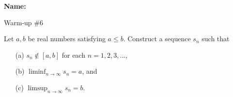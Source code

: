 \documentclass[12pt]{article}
\begin{document}
\noindent \textbf{Name:} 

\begin{center}
Warm-up \#6
\end{center}

\noindent Let $a,b$ be real numbers satisfying $a \leqslant b$. Construct a sequence $s_n$ such that 
\begin{enumerate}
\item[(a)] $s_n \notin [a,b]$ for each $n =1, 2, 3, \ldots$, 
\item[(b)] $\liminf_{n \to \infty}s_n = a$, and 
\item[(c)] $\limsup_{n \to \infty}s_n = b.$
\end{enumerate}
\end{document}
